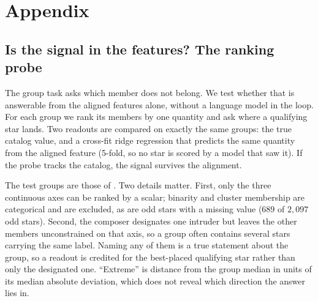 \section{Appendix}\label{sec:appendix}

\subsection{Is the signal in the features? The ranking probe}\label{app:probe}
The group task asks which member does not belong. We test whether that is
answerable from the aligned features alone, without a language model in the
loop. For each group we rank its members by one quantity and ask where a
qualifying star lands. Two readouts are compared on exactly the same groups:
the true catalog value, and a cross-fit ridge regression that predicts the same
quantity from the aligned feature (5-fold, so no star is scored by a model that
saw it). If the probe tracks the catalog, the signal survives the alignment.

The test groups are those of . Two details matter. First, only the three continuous axes can be ranked by a
scalar; binarity and cluster membership are categorical and are excluded, as are odd stars with a missing value
($689$ of $2{,}097$ odd stars). Second, the composer designates one intruder but
leaves the other members unconstrained on that axis, so a group often contains
several stars carrying the same label. Naming any of them is a true statement about
the group, so a readout is credited for the best-placed qualifying star rather
than only the designated one. ``Extreme'' is distance from the group median in
units of its median absolute deviation, which does not reveal which direction
the answer lies in.

